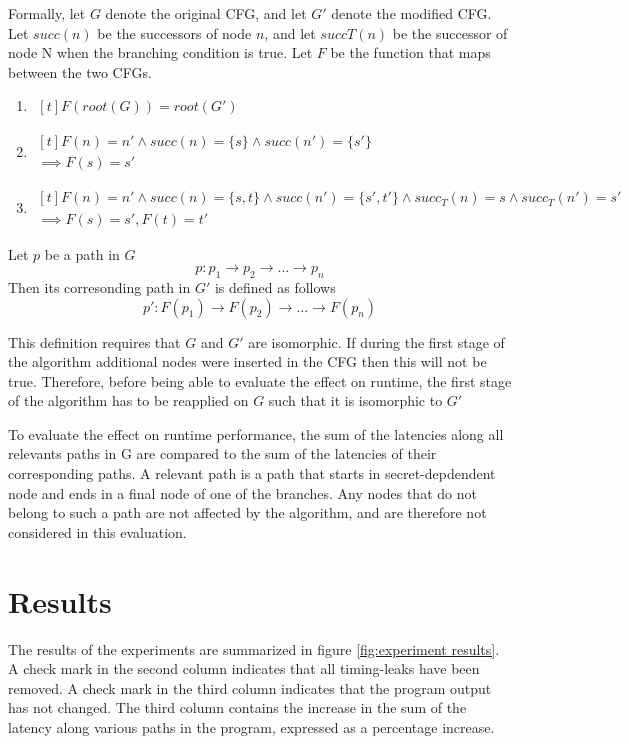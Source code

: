 Formally, let $G$ denote the original CFG, and let $G'$ denote the modified CFG. Let $succ(n)$ be the successors of node $n$, and let $succT(n)$ be 
the successor of node N when the branching condition is true. Let $F$ be the function that maps between the two CFGs.  
\begin{enumerate}
    \item $\begin{aligned}[t]
    F(root(G)) = root(G')
\end{aligned}$
\item $\begin{aligned}[t]
    F(n) = n' \land succ(n) = \{s\} \land succ(n')=\{s'\} \\ 
    \implies F(s)=s'
\end{aligned}$
\item $\begin{aligned}[t]
    F(n) = n' \land succ(n) = \{s, t\} \land succ(n')=\{s', t'\} \land succ_T(n)=s \land succ_T(n') = s'\\
    \implies F(s)=s', F(t) = t'
\end{aligned}$
\end{enumerate}
Let $p$ be a path in $G$
$$ p: p_1 \rightarrow p_2 \rightarrow ... \rightarrow p_n$$
Then its corresonding path in $G'$ is defined as follows 
$$ p': F(p_1) \rightarrow F(p_2) \rightarrow ... \rightarrow F(p_n)$$

This definition requires that $G$ and $G'$ are isomorphic. If during the first stage of the algorithm additional nodes were inserted in the CFG
then this will not be true. Therefore, before being able to evaluate the effect on runtime, the first stage of the algorithm has to be reapplied on $G$ such 
that it is isomorphic to $G'$

To evaluate the effect on runtime performance, the sum of the latencies along all relevants paths in G are compared to the sum of the latencies of their corresponding paths. A relevant path is a path that starts in secret-depdendent node and ends in a final node of one of the branches. Any nodes that do not belong to such a path 
are not affected by the algorithm, and are therefore not considered in this evaluation. 

    
\section{Results}
\label{sec:results}
The results of the experiments are summarized in figure \ref{fig:experiment results}.
A check mark in the second column indicates that all timing-leaks have been removed. 
A check mark in the third column indicates that the program output has not changed. 
The third column contains the increase in the sum of the latency along various paths in the program, expressed as a percentage increase.


